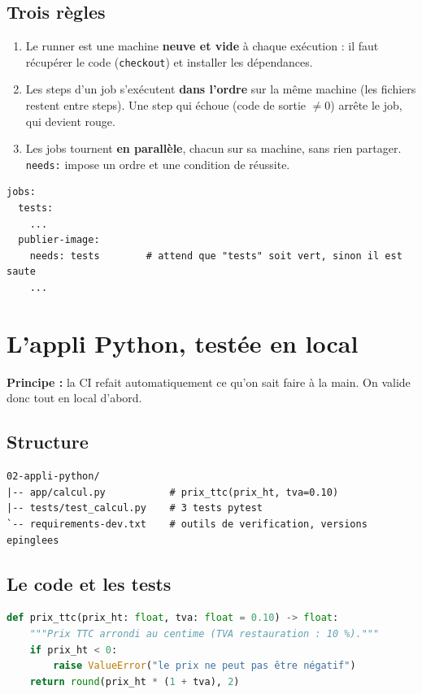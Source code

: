 \documentclass[11pt,a4paper]{article}
\newcommand{\cmd}[1]{\texttt{#1}}
\begin{document}
\subsection*{Trois règles}
\begin{enumerate}
  \item Le runner est une machine \textbf{neuve et vide} à chaque exécution : il faut récupérer le code (\cmd{checkout}) et installer les dépendances.
  \item Les steps d'un job s'exécutent \textbf{dans l'ordre} sur la même machine (les fichiers restent entre steps). Une step qui échoue (code de sortie $\neq 0$) arrête le job, qui devient rouge.
  \item Les jobs tournent \textbf{en parallèle}, chacun sur sa machine, sans rien partager. \cmd{needs:} impose un ordre et une condition de réussite.
\end{enumerate}

\begin{lstlisting}
jobs:
  tests:
    ...
  publier-image:
    needs: tests        # attend que "tests" soit vert, sinon il est saute
    ...
\end{lstlisting}

\section{L'appli Python, testée en local}

\textbf{Principe :} la CI refait automatiquement ce qu'on sait faire à la main. On valide donc tout en local d'abord.

\subsection{Structure}
\begin{lstlisting}
02-appli-python/
|-- app/calcul.py           # prix_ttc(prix_ht, tva=0.10)
|-- tests/test_calcul.py    # 3 tests pytest
`-- requirements-dev.txt    # outils de verification, versions epinglees
\end{lstlisting}

\subsection{Le code et les tests}
\begin{lstlisting}[language=Python]
def prix_ttc(prix_ht: float, tva: float = 0.10) -> float:
    """Prix TTC arrondi au centime (TVA restauration : 10 %)."""
    if prix_ht < 0:
        raise ValueError("le prix ne peut pas être négatif")
    return round(prix_ht * (1 + tva), 2)
\end{lstlisting}
\end{document}
